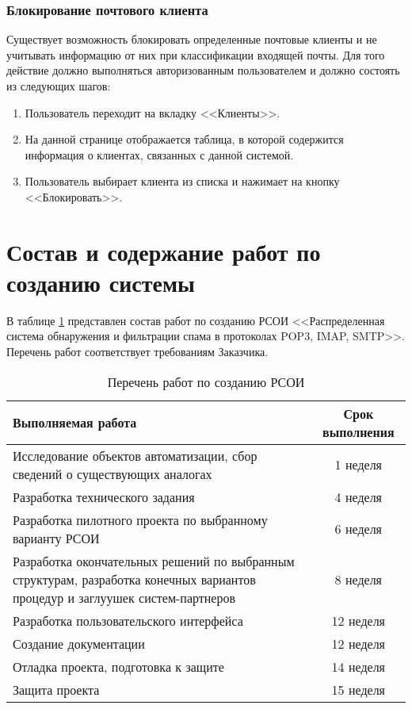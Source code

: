 \subsubsection*{Блокирование почтового клиента}
Существует возможность блокировать определенные почтовые клиенты и не учитывать информацию от них при классификации входящей почты. Для того действие должно выполняться авторизованным пользователем и должно состоять из следующих шагов:

\begin{enumerate}
  \item Пользователь переходит на вкладку <<Клиенты>>.
  \item На данной странице отображается таблица, в которой содержится информация о клиентах, связанных с данной системой.
  \item Пользователь выбирает клиента из списка и нажимает на кнопку <<Блокировать>>.
\end{enumerate}

\section{Состав и содержание работ по созданию системы}
В таблице \ref{tab:sostav} представлен состав работ по созданию РСОИ <<Распределенная система обнаружения и фильтрации спама в протоколах POP3, IMAP, SMTP>>. Перечень работ соответствует требованиям Заказчика.

\begin{table}[ht]
  \caption{Перечень работ по созданию РСОИ}
  \begin{tabular}{|p{}|c|}
  \hline
  Выполняемая работа & Срок выполнения\\
  \hline
  Исследование объектов автоматизации, сбор сведений о существующих аналогах & 1 неделя \\
  \hline
  Разработка технического задания & 4 неделя \\
  \hline
  Разработка пилотного проекта по выбранному варианту РСОИ & 6 неделя \\
  \hline
  Разработка окончательных решений по выбранным структурам, разработка конечных вариантов процедур и заглуушек систем-партнеров & 8 неделя \\
  \hline
  Разработка пользовательского интерфейса & 12 неделя \\ 
  \hline
   Создание документации & 12 неделя \\
  \hline
  Отладка проекта, подготовка к защите & 14 неделя \\
  \hline
  Защита проекта & 15 неделя\\
  \hline
  \end{tabular}
  \label{tab:sostav}
\end{table}


